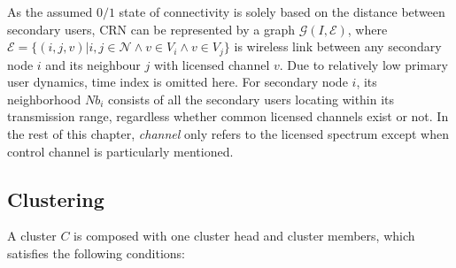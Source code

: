\documentclass[journal,comsoc]{IEEEtran}
\theoremstyle{mytheoremstyle}
\theoremstyle{mytheoremstyle}
\theoremstyle{mytheoremstyle}
\begin{document}
As the assumed $0/1$ state of connectivity is solely based on the distance between secondary users, CRN can be represented by a graph $\mathcal{G}(I,\mathcal{E})$, where $\mathcal{E}=\lbrace(i,j,v) \vert i, j \in \mathcal{N} \wedge v\in V_i \wedge v\in V_j \rbrace$ is wireless link between any secondary node $i$ and its neighbour $j$ with licensed channel $v$.
Due to relatively low primary user dynamics, time index is omitted here.
For secondary node $i$, its neighborhood $Nb_i$ consists of all the secondary users locating within its transmission range, regardless whether common licensed channels exist or not. 
In the rest of this chapter, \textit{channel} only refers to the licensed spectrum except when control channel is particularly mentioned.

\subsection{Clustering}
\label{def_cluster}
A cluster $C$ is composed with one cluster head and cluster members, which satisfies the following conditions:
\end{document}
